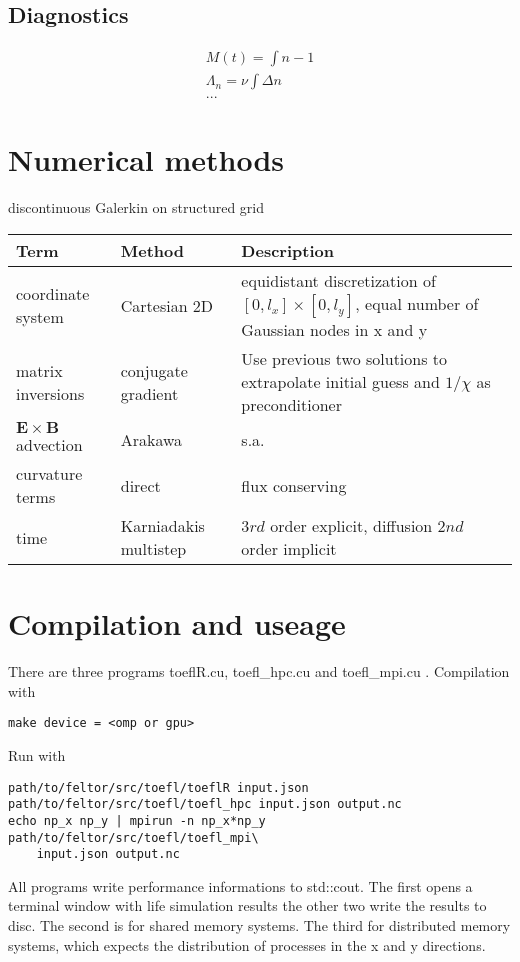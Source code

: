 \documentclass{hitec}
\newcommand{\ExB}{$\bm{E}\times\bm{B} \,$}
\begin{document}
\subsection{Diagnostics}
\begin{align}
    M(t) = \int n-1 \\
    \Lambda_n = \nu \int \Delta n  \\
    ...
    \label{}
\end{align}
\section{Numerical methods}
discontinuous Galerkin on structured grid
\begin{longtable}{ll>{\RaggedRight}p{7cm}}
\toprule
\rowcolor{gray!50}\textbf{Term} &  \textbf{Method} & \textbf{Description}  \\ \midrule
coordinate system & Cartesian 2D & equidistant discretization of $[0,l_x] \times [0,l_y]$, equal number of Gaussian nodes in x and y \\
matrix inversions & conjugate gradient & Use previous two solutions to extrapolate initial guess and $1/\chi$ as preconditioner \\
\ExB advection & Arakawa & s.a. \cite{Einkemmer2013} \\
curvature terms & direct & flux conserving \\
time &  Karniadakis multistep & $3rd$ order explicit, diffusion $2nd$ order implicit \\
\bottomrule
\end{longtable}

\section{Compilation and useage}
There are three programs toeflR.cu, toefl\_hpc.cu and toefl\_mpi.cu . Compilation with 
\begin{verbatim}
make device = <omp or gpu>
\end{verbatim}
Run with
\begin{verbatim}
path/to/feltor/src/toefl/toeflR input.json
path/to/feltor/src/toefl/toefl_hpc input.json output.nc
echo np_x np_y | mpirun -n np_x*np_y path/to/feltor/src/toefl/toefl_mpi\
    input.json output.nc
\end{verbatim}
All programs write performance informations to std::cout.
The first opens a terminal window with life simulation results the
other two write the results to disc. The
second is for shared memory systems. The third for distributed
memory systems, which expects the distribution of processes in the
x and y directions.
\end{document}
